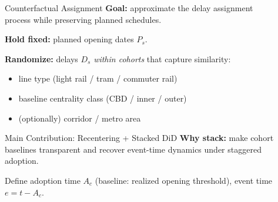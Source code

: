 \documentclass[final]{beamer}
\newlength{\sepwidth}
\newlength{\colwidth}
\newcommand{\separatorcolumn}{\begin{column}{\sepwidth}\end{column}}
\begin{document}
\begin{frame}[t]
\begin{columns}[t]
\begin{column}{\colwidth}
\end{column}

\separatorcolumn

\begin{column}{\colwidth}

  \begin{block}{Counterfactual Assignment}
  \textbf{Goal:} approximate the delay assignment process while preserving planned schedules.

  \vspace{0.4em}
  \textbf{Hold fixed:} planned opening dates $P_s$.

  \textbf{Randomize:} delays $D_s$ \emph{within cohorts} that capture similarity:
  \begin{itemize}
    \item line type (light rail / tram / commuter rail)
    \item baseline centrality class (CBD / inner / outer)
    \item (optionally) corridor / metro area
  \end{itemize}

  \vspace{0.6em}
  \begin{center}
  \end{center}
  \end{block}

  \begin{block}{Main Contribution: Recentering + Stacked DiD}
  \textbf{Why stack:} make cohort baselines transparent and recover event-time dynamics under staggered adoption.

  \vspace{0.6em}
  Define adoption time $A_c$ (baseline: realized opening threshold), event time $e=t-A_c$.


\end{block}
\end{column}
\end{columns}
\end{frame}
\end{document}
